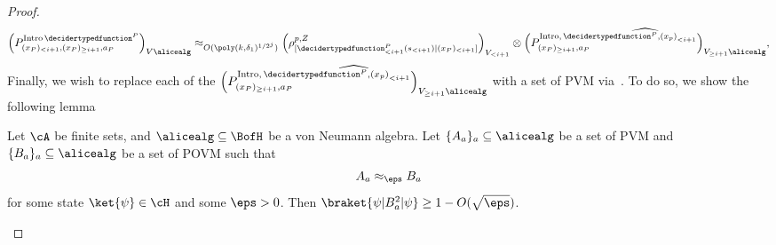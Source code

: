 \begin{proof}
\begin{equation}
		\left(P^{\text{Intro} \, \decidertypedfunction^P}_{(x_P)_{< i+1}, (x_P)_{\geq i+1}, a_P} \right)_{V \alicealg}	\approx_{O(\poly(k, \delta_1)^{1/2^j})} \left(\rho^{p,Z}_{[\decidertypedfunction^P_{< i+1}(s_{< i+1})|(x_P)_{< i+1} ]}\right)_{V_{< i+1}} \otimes \widehat{\left(P^{\text{Intro}, \, \decidertypedfunction^P, \left(x_p\right)_{< i+1}}_{(x_P)_{\geq i+1}, a_P} \right)_{V_{\geq i+1} \alicealg}}, 
	\end{equation}
	Finally, we wish to replace each of the $\widehat{\left(P^{\text{Intro}, \, \decidertypedfunction^P, \left(x_p\right)_{< i+1}}_{(x_P)_{\geq i+1}, a_P} \right)_{V_{\geq i+1} \alicealg}}$ with a set of PVM via~. To do so, we show the following lemma
	\begin{lemma} \label{lem:approximationofPOVMtoPVM}
		Let $\cA$ be finite sets, and $\alicealg \subseteq \BofH$ be a von Neumann algebra. Let $\{ A_{a} \}_a \subseteq \alicealg$ be a set of PVM and $\{ B_{a} \}_a \subseteq \alicealg$ be a set of POVM such that 
		\begin{equation*}
			A_{a} \approx_{\eps}  B_{a}
		\end{equation*}
		for some state $\ket{\psi} \in \cH$ and some $\eps > 0$. Then $\braket{\psi|B_a^2|\psi} \geq 1 - O(\sqrt{\eps})$.
	\end{lemma}
	

\end{proof}
